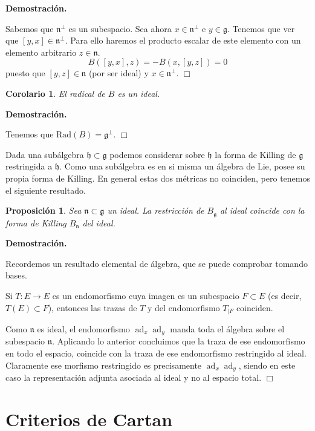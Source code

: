 \documentclass[a4paper,draft,12pt]{article}
\newtheorem{propo}[teo]{Proposición}%
\newtheorem{cor}[teo]{Corolario}%
\newcommand{\dem}{\noindent \textbf{Demostración. }\vspace{0.3 cm}}%
\newcommand{\g}{\mathfrak{g}}%
\newcommand{\fin}{ $\Box $ \vspace{0.4 cm}}
\DeclareMathOperator{\ad}{ad}  %
\begin{document}
\dem


Sabemos que $\mathfrak{n}^\perp$ es un subespacio.  Sea ahora $x \in \mathfrak{n}^\perp$ e $y \in \g$.  Tenemos que ver que $[y,x] \in \mathfrak{n}^\perp$.  Para ello haremos el producto escalar de este elemento con un elemento arbitrario $z \in \mathfrak{n}$.
$$
B([y,x],z)= -B(x,[y,z])=0
$$
puesto que $[y,z] \in \mathfrak{n}$ (por ser ideal) y $x \in \mathfrak{n}^\perp$. \fin

\begin{cor}

El radical de $B$ es un ideal.

\end{cor}

\dem

Tenemos que $\textrm{Rad}(B)= \g^\perp$.  \fin


Dada una subálgebra $\mathfrak{h} \subset \g$ podemos considerar sobre $\mathfrak{h}$ la forma de Killing de $\g$ restringida a $\mathfrak{h}$.  Como una subálgebra es en si misma un álgebra de Lie, posee su propia forma de Killing.  En general estas dos métricas no coinciden, pero tenemos el siguiente resultado.

\begin{propo}

Sea $\mathfrak{n}\subset \g$ un ideal.  La restricción de $B_\g$ al ideal coincide con la forma de Killing $B_\mathfrak{n}$ del ideal.

\end{propo}

\dem

Recordemos un resultado elemental de álgebra, que se puede comprobar tomando bases.

Si $T:E \rightarrow E$ es un endomorfismo cuya imagen es un subespacio $F \subset E$ (es decir, $T(E) \subset F$), entonces las trazas de $T$ y del endomorfismo $T_{\mid F}$ coinciden.

Como $\mathfrak{n}$ es ideal, el endomorfismo $\ad_x\ad_y$ manda toda el álgebra sobre el subespacio $\mathfrak{n}$.  Aplicando lo anterior concluimos que la traza de ese endomorfismo en todo el espacio, coincide con la traza de ese endomorfismo restringido al ideal.  Claramente ese morfismo restringido es precisamente $\ad_x\ad_y$, siendo en este caso la representación adjunta asociada al ideal y no al espacio total.  \fin

\newpage
 
 \section{Criterios de Cartan}
 
\end{document}
